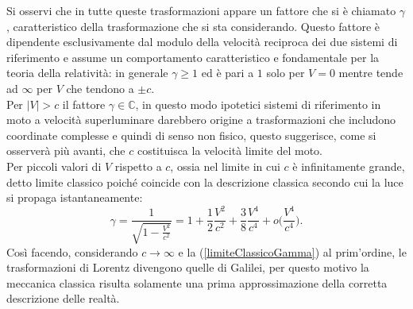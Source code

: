 Si osservi che in tutte queste trasformazioni appare un fattore che si è chiamato $\gamma$, caratteristico della trasformazione che si sta considerando. Questo fattore è dipendente esclusivamente dal modulo della velocità reciproca dei due sistemi di riferimento e assume un comportamento caratteristico e fondamentale per la teoria della relatività: in generale $\gamma\geq 1$ ed è pari a $1$ solo per $V=0$ mentre tende ad $\infty$ per $V$ che tendono a $\pm c$.\\
Per $|V|>c$ il fattore $\gamma\in\mathbb{C}$, in questo modo ipotetici sistemi di riferimento in moto a velocità superluminare darebbero origine a trasformazioni che includono coordinate complesse e quindi di senso non fisico, questo suggerisce, come si osserverà più avanti, che $c$ costituisca la velocità limite del moto.\\
Per piccoli valori di $V$ rispetto a $c$, ossia nel limite in cui $c$ è infinitamente grande, detto limite classico poiché coincide con la descrizione classica secondo cui la luce si propaga istantaneamente:
\begin{equation}
    \gamma=\frac{1}{\sqrt{1-\frac{V^2}{c^2}}}=1+\frac12\frac{V^2}{c^2}+\frac38\frac{V^4}{c^4}+o\bigg(\frac{V^4}{c^4}\bigg).
    \label{limiteClassicoGamma}
\end{equation}
Così facendo, considerando $c\rightarrow\infty$ e la (\ref{limiteClassicoGamma}) al prim'ordine, le trasformazioni di Lorentz divengono quelle di Galilei, per questo motivo la meccanica classica risulta solamente una prima approssimazione della corretta descrizione delle realtà.

